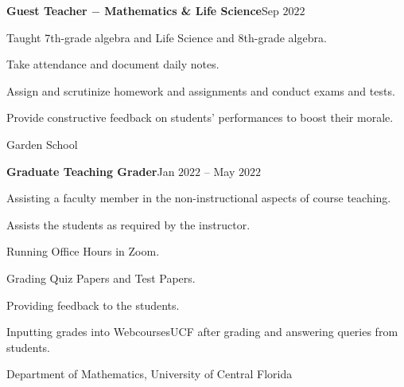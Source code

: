 \documentclass[a4paper, 12pt]{article}
\begin{document}
\begin{flushleft}
\begin{flushleft}
\textbf{Guest Teacher $-$ Mathematics \& Life Science}\hfill Sep $2022$\\
\begin{compactitem}
    \item Taught 7th-grade algebra and Life Science and 8th-grade algebra.
    \item Take attendance and document daily notes.
    \item Assign and scrutinize homework and assignments and conduct exams and tests.
    \item Provide constructive feedback on students' performances to boost their morale.
\end{compactitem}
Garden School
\end{flushleft}

\begin{flushleft}
\textbf{Graduate Teaching Grader}\hfill Jan $2022$ -- May $2022$\\
\begin{compactitem}
    \item Assisting a faculty member in the non-instructional aspects of course teaching.
    \item Assists the students as required by the instructor.
    \item Running Office Hours in Zoom.
    \item Grading Quiz Papers and Test Papers.
    \item Providing feedback to the students.
    \item Inputting grades into WebcoursesUCF after grading and answering queries from students.
\end{compactitem}
Department of Mathematics, University of Central Florida
\end{flushleft}


\end{flushleft}
\end{document}
